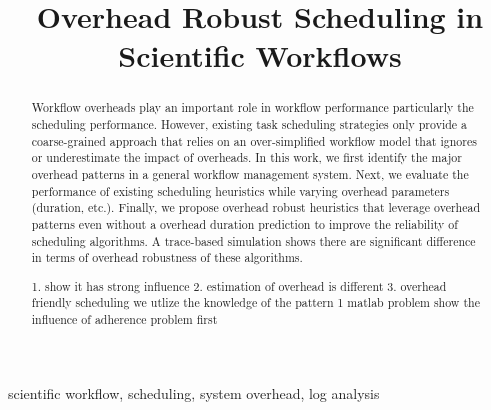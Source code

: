 \documentclass[final]{IEEEtran}
\begin{document}
\title{Overhead Robust Scheduling in Scientific Workflows}


\author{
}

\maketitle


\begin{abstract}
Workflow overheads play an important role in workflow performance particularly the scheduling performance. However, existing task scheduling strategies only provide a coarse-grained approach that relies on an over-simplified workflow model that ignores or underestimate the impact of overheads. In this work, we first identify the major overhead patterns in a general workflow management system. Next, we evaluate the performance of existing scheduling heuristics while varying overhead parameters (duration, etc.). Finally, we propose overhead robust heuristics that leverage overhead patterns even without a overhead duration prediction to improve the reliability of scheduling algorithms. A trace-based simulation shows there are significant difference in terms of overhead robustness of these algorithms. 

1. show it has strong influence
2. estimation of overhead is different
3. overhead friendly scheduling we utlize the knowledge of the pattern 1 matlab problem show the influence of adherence problem first


\end{abstract}

\begin{IEEEkeywords}
scientific workflow, scheduling, system overhead, log analysis
\end{IEEEkeywords}
\end{document}
